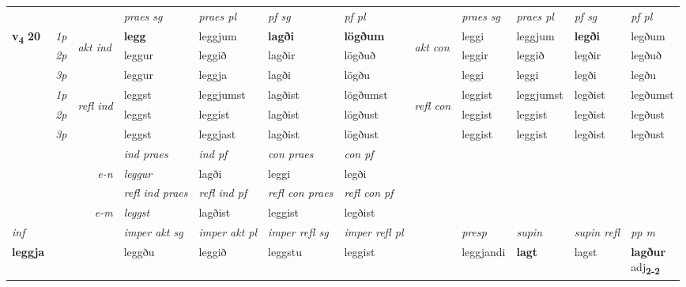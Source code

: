 \begin{longtable}[l]{X>{\footnotesize\itshape}llXXXXlXXXX}
\midrule
 & &   & \textit{praes sg}  & \textit{praes pl}    & \textit{ pf sg} & \textit{pf pl} & & \textit{praes sg}  & \textit{praes pl}    & \textit{pf sg} & \textit{pf pl }  \\ \cmidrule{4-7} \cmidrule{9-12}
 \multirow{2}{*}{{{\textbf{v{\textsubscript{4}}} \Large{\textbf{20}}}}}  & 1p & \multirow{3}{*}{\begin{turn}{90}\textit{akt ind}\end{turn}} & \textbf{legg} & leggjum & \textbf{lagði} & \textbf{lögðum} & \multirow{3}{*}{\begin{turn}{90}\textit{akt con}\end{turn}} &leggi & leggjum & \textbf{legði} & legðum\\*
 & 2p &  &  leggur  & leggið & lagðir & lögðuð & & leggir & leggið & legðir & legðuð \\*
 & 3p &  & leggur & leggja & lagði & lögðu & & leggi & leggi& legði & legðu \\*
\cmidrule{4-7} \cmidrule{9-12}
 & 1p & \multirow{3}{*}{\begin{turn}{90}\textit{refl ind}\end{turn}}  & leggst & leggjumst & lagðist & lögðumst & \multirow{3}{*}{\begin{turn}{90}\textit{refl con}\end{turn}}  &leggist & leggjumst & legðist & legðumst \\*
 & 2p &  & leggst & leggist & lagðist & lögðust & &leggist & leggist & legðist & legðust \\*
 & 3p  & & leggst & leggjast & lagðist & lögðust & & leggist & leggist& legðist & legðust \\*
\cmidrule{4-7} \cmidrule{9-12}

   && &  \textit{ind praes} & \textit{ind pf} & \textit{con praes} & \textit{con pf} \\*
\multicolumn{3}{r}{\textit{e-n}} & leggur & lagði & leggi & legði \\*

\cmidrule{4-7}
 & && \textit{refl ind praes} & \textit{refl ind pf} & \textit{refl con praes} & \textit{refl con pf} \\*
\multicolumn{3}{r}{\textit{e-m}}& leggst & lagðist & leggist & legðist \\*

\cmidrule{4-7}
   {\textit{inf}} & &  & \textit{imper akt sg} & \textit{imper akt pl} & \textit{imper refl sg} & \textit{imper refl pl} && \textit{presp} & \textit{supin} & \textit{supin refl} & \textit{pp m} \\*
  {\textbf{leggja}} & && leggðu  & leggið & leggstu & leggist && leggjandi &  \textbf{lagt} & lagst & \specialcell{\textbf{lagður} \\ adj\textbf{\textsubscript{2-2}}} \\*


\end{longtable}
